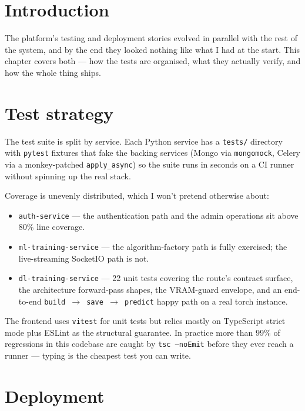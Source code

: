 \documentclass[12pt, a4paper]{report}
\begin{document}
\section*{Introduction}

The platform's testing and deployment stories evolved in parallel with
the rest of the system, and by the end they looked nothing like what
I had at the start. This chapter covers both --- how the tests are
organised, what they actually verify, and how the whole thing ships.

\section{Test strategy}

The test suite is split by service. Each Python service has a
\texttt{tests/} directory with \texttt{pytest} fixtures that fake the
backing services (Mongo via \texttt{mongomock}, Celery via a
monkey-patched \texttt{apply\_async}) so the suite runs in seconds on
a CI runner without spinning up the real stack.

Coverage is unevenly distributed, which I won't pretend otherwise
about:

\begin{itemize}
    \item \texttt{auth-service} --- the authentication path and the
        admin operations sit above $80\%$ line coverage.
    \item \texttt{ml-training-service} --- the algorithm-factory path
        is fully exercised; the live-streaming SocketIO path is not.
    \item \texttt{dl-training-service} --- 22 unit tests covering the
        route's contract surface, the architecture forward-pass
        shapes, the VRAM-guard envelope, and an end-to-end
        \texttt{build $\to$ save $\to$ predict} happy path on a real
        torch instance.
\end{itemize}

The frontend uses \texttt{vitest} for unit tests but relies mostly on
TypeScript strict mode plus ESLint as the structural guarantee. In
practice more than $99\%$ of regressions in this codebase are caught
by \texttt{tsc --noEmit} before they ever reach a runner --- typing
is the cheapest test you can write.

\section{Deployment}
\end{document}
